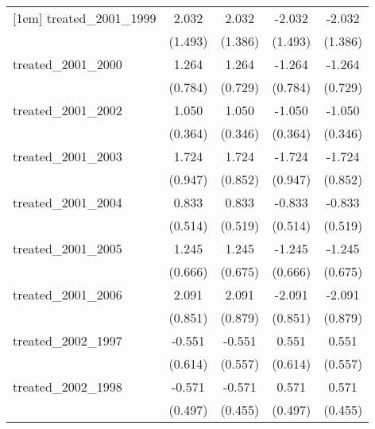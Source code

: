 {\begin{tabular}{l*{4}{c}}
[1em]
treated\_2001\_1999&       2.032         &       2.032         &      -2.032         &      -2.032         \\
            &     (1.493)         &     (1.386)         &     (1.493)         &     (1.386)         \\
[1em]
treated\_2001\_2000&       1.264         &       1.264         &      -1.264         &      -1.264         \\
            &     (0.784)         &     (0.729)         &     (0.784)         &     (0.729)         \\
[1em]
treated\_2001\_2002&       1.050\sym{**} &       1.050\sym{**} &      -1.050\sym{**} &      -1.050\sym{**} \\
            &     (0.364)         &     (0.346)         &     (0.364)         &     (0.346)         \\
[1em]
treated\_2001\_2003&       1.724         &       1.724\sym{*}  &      -1.724         &      -1.724\sym{*}  \\
            &     (0.947)         &     (0.852)         &     (0.947)         &     (0.852)         \\
[1em]
treated\_2001\_2004&       0.833         &       0.833         &      -0.833         &      -0.833         \\
            &     (0.514)         &     (0.519)         &     (0.514)         &     (0.519)         \\
[1em]
treated\_2001\_2005&       1.245         &       1.245         &      -1.245         &      -1.245         \\
            &     (0.666)         &     (0.675)         &     (0.666)         &     (0.675)         \\
[1em]
treated\_2001\_2006&       2.091\sym{*}  &       2.091\sym{*}  &      -2.091\sym{*}  &      -2.091\sym{*}  \\
            &     (0.851)         &     (0.879)         &     (0.851)         &     (0.879)         \\
[1em]
treated\_2002\_1997&      -0.551         &      -0.551         &       0.551         &       0.551         \\
            &     (0.614)         &     (0.557)         &     (0.614)         &     (0.557)         \\
[1em]
treated\_2002\_1998&      -0.571         &      -0.571         &       0.571         &       0.571         \\
            &     (0.497)         &     (0.455)         &     (0.497)         &     (0.455)         \\

\end{tabular}}
